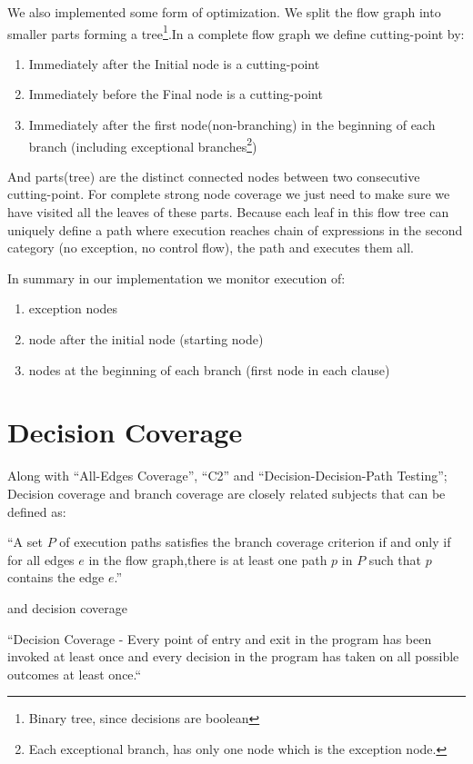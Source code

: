\documentclass[12pt,a4paper]{report}
\begin{document}
We also implemented some form of optimization. We split the flow graph into smaller parts forming a tree\footnote{Binary tree, since decisions are
 boolean}.In a complete flow graph we define cutting-point by:  

\begin{enumerate}
 \item Immediately after the Initial node is a cutting-point
 \item Immediately before the Final node is a cutting-point
 \item Immediately after the first node(non-branching) in the beginning of each branch (including exceptional branches\footnote{Each exceptional branch,
 has only one node which is the exception node.}) 
\end{enumerate}


And parts(tree) are the distinct connected nodes between two consecutive cutting-point. For complete strong node coverage we just need to make sure we have
 visited all the leaves of these parts. Because each leaf in this flow tree can uniquely define a path where execution reaches chain of expressions in the
 second category (no exception, no control flow),
 the path and executes them all.

In summary in our implementation we monitor execution of:

\begin{enumerate}
 \item exception nodes
 \item node after the initial node (starting node)
 \item nodes at the beginning of each branch (first node in each clause)  
\end{enumerate}

\section{Decision Coverage}
Along with ``All-Edges Coverage'', ``C2'' and ``Decision-Decision-Path Testing''; Decision coverage and branch coverage are closely related subjects that
 can be defined as:

“A set $P$ of execution paths satisfies the branch coverage criterion if and only if for all
 edges $e$ in the flow graph,there is at least one path $p$ in $P$ such that $p$ contains the edge $e$.”\cite{Zhu:1997:SUT:267580.267590}

and decision coverage

“Decision Coverage - Every point of entry and exit in the program has been invoked at least once and every decision in the program has taken on all
 possible outcomes at least once.“\cite{cast-10}
\end{document}

